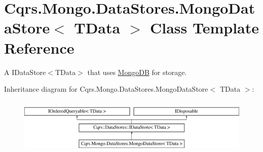\hypertarget{classCqrs_1_1Mongo_1_1DataStores_1_1MongoDataStore}{}\section{Cqrs.\+Mongo.\+Data\+Stores.\+Mongo\+Data\+Store$<$ T\+Data $>$ Class Template Reference}
\label{classCqrs_1_1Mongo_1_1DataStores_1_1MongoDataStore}


A I\+Data\+Store$<$\+T\+Data$>$ that uses \hyperlink{namespaceCqrs_1_1MongoDB}{Mongo\+DB} for storage.  


Inheritance diagram for Cqrs.\+Mongo.\+Data\+Stores.\+Mongo\+Data\+Store$<$ T\+Data $>$\+:\begin{figure}[H]
\begin{center}
\leavevmode
\includegraphics[height=2.700965cm]{classCqrs_1_1Mongo_1_1DataStores_1_1MongoDataStore}
\end{center}
\end{figure}
